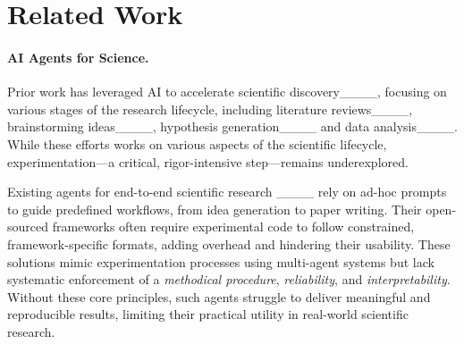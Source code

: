 \section{Related Work}
\label{subsec:related-work}



\paragraph{AI Agents for Science.}
Prior work has leveraged AI to accelerate scientific discovery____, focusing on various stages of the research lifecycle, including literature reviews____, brainstorming ideas____, hypothesis generation____ and data analysis____.
While these efforts works on various aspects of the scientific lifecycle, experimentation—a critical, rigor-intensive step—remains underexplored.

Existing agents for end-to-end scientific research ____ rely on ad-hoc prompts to guide predefined workflows, from idea generation to paper writing.
Their open-sourced frameworks often require experimental code to follow constrained, framework-specific formats, adding overhead and hindering their usability.
These solutions mimic experimentation processes using multi-agent systems but lack systematic enforcement of a \textit{methodical procedure}, \textit{reliability}, and \textit{interpretability}.
Without these core principles, such agents struggle to deliver meaningful and reproducible results, limiting their practical utility in real-world scientific research.





